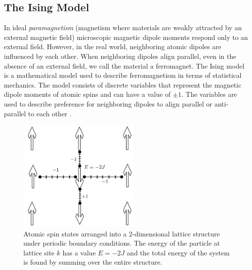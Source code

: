 \subsection{The Ising Model}
In ideal \textit{paramagnetism} (magnetism where materials are weakly attracted by an external magnetic field) microscopic magnetic dipole moments respond only to an external field. 
However, in the real world, neighboring atomic dipoles are influenced by each other. 
When neighboring dipoles align parallel, even in the absence of an external field, we call the material a ferromagnet. 
The Ising model is a mathematical model used to describe ferromagnetism in terms of statistical mechanics. The model consists of discrete variables that represent the magnetic dipole moments of atomic spins and can have a value of $\pm 1$. 
The variables are used to describe preference for neighboring dipoles to align parallel or anti-parallel to each other \cite{schroeder2011thermal}.
\begin{figure}[h]
	\begin{center}
		\includegraphics[width=6cm]{images/lattice}
	\end{center}
	\caption{\doublespacing Atomic spin states arranged into a 2-dimensional lattice structure under periodic boundary conditions. The energy of the particle at lattice site $k$ has a value $E = -2J$ and the total energy of the system is found by summing over the entire structure.}
	\label{fig:lattice}
\end{figure}

